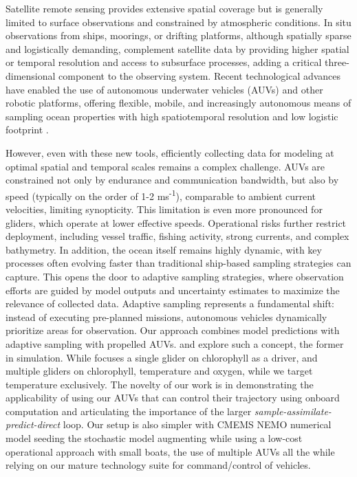 Satellite remote sensing provides extensive spatial coverage but is
generally limited to surface observations and constrained by
atmospheric conditions. In situ observations from ships, moorings, or
drifting platforms, although spatially sparse and logistically
demanding, complement satellite data by providing higher spatial or
temporal resolution and access to subsurface processes, adding a
critical three-dimensional component to the observing system. Recent
technological advances have enabled the use of autonomous underwater
vehicles (AUVs) and other robotic platforms, offering flexible,
mobile, and increasingly autonomous means of sampling ocean properties
with high spatiotemporal resolution and low logistic footprint
\parencite{das11b,graham12,das15,fossum18}.

However, even with these new tools, efficiently collecting data for
modeling at optimal spatial and temporal scales remains a complex
challenge. AUVs are constrained not only by endurance and
communication bandwidth, but also by speed (typically on the order of
1-2 ms\textsuperscript{-1}), comparable to ambient current velocities,
limiting synopticity. This limitation is even more pronounced for
gliders, which operate at lower effective speeds. Operational risks
further restrict deployment, including vessel traffic, fishing
activity, strong currents, and complex bathymetry. In addition, the
ocean itself remains highly dynamic, with key processes often evolving
faster than traditional ship-based sampling strategies can
capture. This opens the door to adaptive sampling strategies, where
observation efforts are guided by model outputs and uncertainty
estimates to maximize the relevance of collected data. Adaptive
sampling \parencite{BinZhang07,Singh09,fossum19} represents a fundamental
shift: instead of executing pre-planned missions, autonomous vehicles
dynamically prioritize areas for observation.  Our approach combines
model predictions with adaptive sampling with propelled AUVs. 
  \cite{lermusiaux07} and \cite{ford22,wihsgott26} explore such a
  concept, the former in simulation. While \cite{ford22} focuses a
  single glider on chlorophyll as a driver, and \cite{wihsgott26}
  multiple gliders on chlorophyll, temperature and oxygen, while we
  target temperature exclusively.  The novelty of our work is in
  demonstrating the applicability of using our AUVs that can control
  their trajectory using onboard computation and articulating the
  importance of the larger \emph{sample-assimilate-predict-direct}
  loop. Our setup is also simpler with CMEMS NEMO numerical model
  seeding the stochastic model augmenting while using a low-cost
  operational approach with small boats, the use of multiple AUVs all
  the while relying on our mature technology suite for command/control
  of vehicles.

